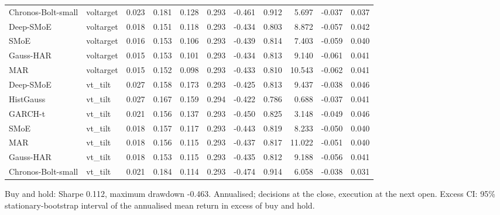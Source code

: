 \begin{table}[!htbp]
\begin{adjustbox}{max width=\textwidth}
\begin{tabular}{llrrrrrrrrr}
Chronos-Bolt-small & voltarget & 0.023 & 0.181 & 0.128 & 0.293 & -0.461 & 0.912 & 5.697 & -0.037 & 0.037\\
Deep-SMoE & voltarget & 0.018 & 0.151 & 0.118 & 0.293 & -0.434 & 0.803 & 8.872 & -0.057 & 0.042\\
SMoE & voltarget & 0.016 & 0.153 & 0.106 & 0.293 & -0.439 & 0.814 & 7.403 & -0.059 & 0.040\\
Gauss-HAR & voltarget & 0.015 & 0.153 & 0.101 & 0.293 & -0.434 & 0.813 & 9.140 & -0.061 & 0.041\\
MAR & voltarget & 0.015 & 0.152 & 0.098 & 0.293 & -0.433 & 0.810 & 10.543 & -0.062 & 0.041\\
Deep-SMoE & vt\_tilt & 0.027 & 0.158 & 0.173 & 0.293 & -0.425 & 0.813 & 9.437 & -0.038 & 0.046\\
HistGauss & vt\_tilt & 0.027 & 0.167 & 0.159 & 0.294 & -0.422 & 0.786 & 0.688 & -0.037 & 0.041\\
GARCH-t & vt\_tilt & 0.021 & 0.156 & 0.137 & 0.293 & -0.450 & 0.825 & 3.148 & -0.049 & 0.046\\
SMoE & vt\_tilt & 0.018 & 0.157 & 0.117 & 0.293 & -0.443 & 0.819 & 8.233 & -0.050 & 0.040\\
MAR & vt\_tilt & 0.018 & 0.156 & 0.115 & 0.293 & -0.437 & 0.817 & 11.022 & -0.051 & 0.040\\
Gauss-HAR & vt\_tilt & 0.018 & 0.153 & 0.115 & 0.293 & -0.435 & 0.812 & 9.188 & -0.056 & 0.041\\
Chronos-Bolt-small & vt\_tilt & 0.021 & 0.184 & 0.114 & 0.293 & -0.474 & 0.914 & 6.058 & -0.038 & 0.031\\
\bottomrule
\end{tabular}
\end{adjustbox}
\par\smallskip\begin{minipage}{\textwidth}\footnotesize
Buy and hold: Sharpe 0.112, maximum drawdown -0.463. Annualised; decisions at the close, execution at the next open. Excess CI: 95\% stationary-bootstrap interval of the annualised mean return in excess of buy and hold.
\end{minipage}
\end{table}
